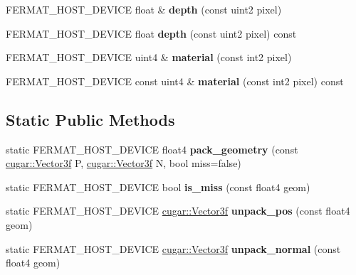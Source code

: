 \begin{DoxyCompactItemize}
\item 
\mbox{\label{struct_g_buffer_view_a7125f1f29664749b97edcc347b6a9eaf}} 
F\+E\+R\+M\+A\+T\+\_\+\+H\+O\+S\+T\+\_\+\+D\+E\+V\+I\+CE float \& {\bfseries depth} (const uint2 pixel)
\item 
\mbox{\label{struct_g_buffer_view_ad294fb5068f57b7b45bd605c9019cbe2}} 
F\+E\+R\+M\+A\+T\+\_\+\+H\+O\+S\+T\+\_\+\+D\+E\+V\+I\+CE float {\bfseries depth} (const uint2 pixel) const
\item 
\mbox{\label{struct_g_buffer_view_ae6ff54317d5a1f4d0e739627f31e63b3}} 
F\+E\+R\+M\+A\+T\+\_\+\+H\+O\+S\+T\+\_\+\+D\+E\+V\+I\+CE uint4 \& {\bfseries material} (const int2 pixel)
\item 
\mbox{\label{struct_g_buffer_view_a482c61ef3e5708cda13c6d5e1fb4ead4}} 
F\+E\+R\+M\+A\+T\+\_\+\+H\+O\+S\+T\+\_\+\+D\+E\+V\+I\+CE const uint4 \& {\bfseries material} (const int2 pixel) const
\end{DoxyCompactItemize}
\subsection*{Static Public Methods}
\begin{DoxyCompactItemize}
\item 
\mbox{\label{struct_g_buffer_view_aa74af4dc09a0b16d821e4957a42fed4c}} 
static F\+E\+R\+M\+A\+T\+\_\+\+H\+O\+S\+T\+\_\+\+D\+E\+V\+I\+CE float4 {\bfseries pack\+\_\+geometry} (const \hyperlink{structcugar_1_1_vector}{cugar\+::\+Vector3f} P, \hyperlink{structcugar_1_1_vector}{cugar\+::\+Vector3f} N, bool miss=false)
\item 
\mbox{\label{struct_g_buffer_view_a03b429b1fdd9ad3d543a2a3b8e8992d8}} 
static F\+E\+R\+M\+A\+T\+\_\+\+H\+O\+S\+T\+\_\+\+D\+E\+V\+I\+CE bool {\bfseries is\+\_\+miss} (const float4 geom)
\item 
\mbox{\label{struct_g_buffer_view_abeb789af27d62cf31ebd7ae8e8db2ea1}} 
static F\+E\+R\+M\+A\+T\+\_\+\+H\+O\+S\+T\+\_\+\+D\+E\+V\+I\+CE \hyperlink{structcugar_1_1_vector}{cugar\+::\+Vector3f} {\bfseries unpack\+\_\+pos} (const float4 geom)
\item 
\mbox{\label{struct_g_buffer_view_a2cfe09f012932c1cf6d5e93658559e5f}} 
static F\+E\+R\+M\+A\+T\+\_\+\+H\+O\+S\+T\+\_\+\+D\+E\+V\+I\+CE \hyperlink{structcugar_1_1_vector}{cugar\+::\+Vector3f} {\bfseries unpack\+\_\+normal} (const float4 geom)
\end{DoxyCompactItemize}
